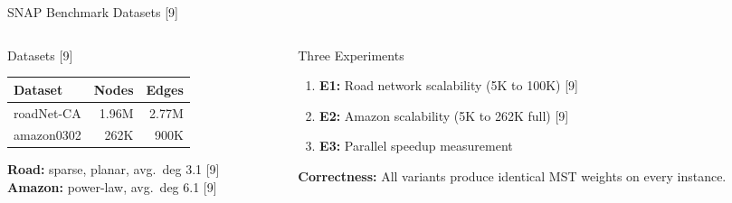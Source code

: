 \documentclass[aspectratio=169, 11pt]{beamer}
\begin{document}
\begin{frame}{SNAP Benchmark Datasets [9]}
\begin{columns}[T]
\begin{column}{0.48\textwidth}
\begin{block}{Datasets [9]}
\renewcommand{\arraystretch}{1.2}
\begin{tabular}{lrr}
\toprule
\textbf{Dataset} & \textbf{Nodes} & \textbf{Edges} \\
\midrule
roadNet-CA & 1.96M & 2.77M \\
amazon0302 & 262K & 900K \\
\bottomrule
\end{tabular}
\vspace{0.3em}
\textbf{Road:} sparse, planar, avg.\ deg 3.1 [9]\\
\textbf{Amazon:} power-law, avg.\ deg 6.1 [9]
\end{block}
\end{column}
\begin{column}{0.48\textwidth}
\begin{block}{Three Experiments}
\begin{enumerate}
    \item \textbf{E1:} Road network scalability (5K to 100K) [9]
    \item \textbf{E2:} Amazon scalability (5K to 262K full) [9]
    \item \textbf{E3:} Parallel speedup measurement
\end{enumerate}
\end{block}
\vspace{0.3em}
\textbf{Correctness:} All variants produce identical MST weights on every instance.
\end{column}
\end{columns}
\end{frame}
\end{document}

